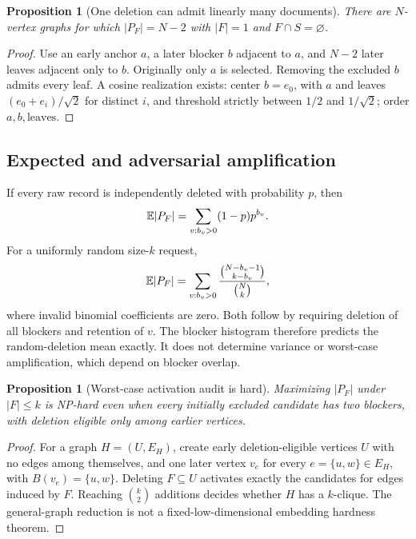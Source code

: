 \documentclass[11pt,a4paper]{article}
\newtheorem{proposition}[theorem]{Proposition}
\theoremstyle{definition}\newtheorem{definition}[theorem]{Definition}
\begin{document}
\begin{proposition}[One deletion can admit linearly many documents]
There are $N$-vertex graphs for which $|P_F|=N-2$ with $|F|=1$ and $F\cap S=\varnothing$.
\end{proposition}
\begin{proof}
Use an early anchor $a$, a later blocker $b$ adjacent to $a$, and $N-2$ later leaves adjacent only to $b$. Originally only $a$ is selected. Removing the excluded $b$ admits every leaf. A cosine realization exists: center $b=e_0$, with $a$ and leaves $(e_0+e_i)/\sqrt2$ for distinct $i$, and threshold strictly between $1/2$ and $1/\sqrt2$; order $a,b,\text{leaves}$.
\end{proof}

\subsection{Expected and adversarial amplification}
If every raw record is independently deleted with probability $p$, then
\begin{equation}
 \mathbb E|P_F|=\sum_{v:b_v>0}(1-p)p^{b_v}.
\end{equation}
For a uniformly random size-$k$ request,
\begin{equation}
 \mathbb E|P_F|=\sum_{v:b_v>0}
 \frac{\binom{N-b_v-1}{k-b_v}}{\binom Nk},
\end{equation}
where invalid binomial coefficients are zero. Both follow by requiring deletion of all blockers and retention of $v$. The blocker histogram therefore predicts the random-deletion mean exactly. It does not determine variance or worst-case amplification, which depend on blocker overlap.

\begin{proposition}[Worst-case activation audit is hard]
Maximizing $|P_F|$ under $|F|\le k$ is NP-hard even when every initially excluded candidate has two blockers, with deletion eligible only among earlier vertices.
\end{proposition}
\begin{proof}
For a graph $H=(U,E_H)$, create early deletion-eligible vertices $U$ with no edges among themselves, and one later vertex $v_e$ for every $e=\{u,w\}\in E_H$, with $B(v_e)=\{u,w\}$. Deleting $F\subseteq U$ activates exactly the candidates for edges induced by $F$. Reaching $\binom k2$ additions decides whether $H$ has a $k$-clique. The general-graph reduction is not a fixed-low-dimensional embedding hardness theorem.
\end{proof}
\end{document}
